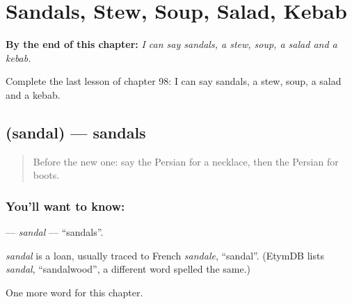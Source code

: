 
\chapter{Sandals, Stew, Soup, Salad, Kebab}
\label{ch:fa-sandals-stew-soup-salad-kebab}

\begin{chapteropening}
\textbf{By the end of this chapter:} \emph{I can say sandals, a stew, soup, a salad and a kebab.}

Complete the last lesson of chapter 98: I can say sandals, a stew, soup, a salad and a kebab.
\end{chapteropening}

\section[\texorpdfstring{\fa{صندل} (sandal)}{صندل (sandal)}]{ (sandal) — sandals}

\label{lesson:FA-C98-sandal}



\begin{quote}
Before the new one: say the Persian for a necklace, then the Persian for boots.
\end{quote}

\subsection*{You'll want to know: }
\textbf{} — \emph{sandal} — \textquotedblleft{}sandals\textquotedblright{}.

\begin{cousinweb}
\emph{sandal} is a loan, usually traced to French \emph{sandale}, \textquotedblleft{}sandal\textquotedblright{}. (EtymDB lists \emph{sandal}, \textquotedblleft{}sandalwood\textquotedblright{}, a different word spelled the same.)
\end{cousinweb}

\begin{grammarlens}[title={What you've built}]
One more word for this chapter.
\end{grammarlens}

